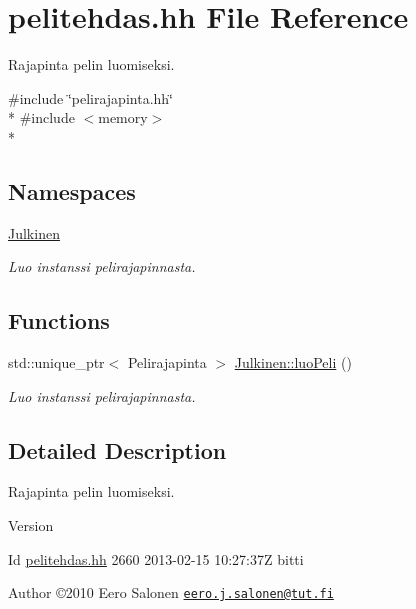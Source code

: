 \hypertarget{pelitehdas_8hh}{}\section{pelitehdas.\+hh File Reference}
\label{pelitehdas_8hh}


Rajapinta pelin luomiseksi.  


{\ttfamily \#include \char`\"{}pelirajapinta.\+hh\char`\"{}}\\*
{\ttfamily \#include $<$memory$>$}\\*
\subsection*{Namespaces}
\begin{DoxyCompactItemize}
\item 
 \hyperlink{namespace_julkinen}{Julkinen}
\begin{DoxyCompactList}\small\item\em Luo instanssi pelirajapinnasta. \end{DoxyCompactList}\end{DoxyCompactItemize}
\subsection*{Functions}
\begin{DoxyCompactItemize}
\item 
std\+::unique\+\_\+ptr$<$ Pelirajapinta $>$ \hyperlink{namespace_julkinen_a6f662833317a55a3a221cb4a3147086e}{Julkinen\+::luo\+Peli} ()
\begin{DoxyCompactList}\small\item\em Luo instanssi pelirajapinnasta. \end{DoxyCompactList}\end{DoxyCompactItemize}


\subsection{Detailed Description}
Rajapinta pelin luomiseksi. 

\begin{DoxyVersion}{Version}

\end{DoxyVersion}
\begin{DoxyParagraph}{Id}
\hyperlink{pelitehdas_8hh}{pelitehdas.\+hh} 2660 2013-\/02-\/15 10\+:27\+:37\+Z bitti 
\end{DoxyParagraph}


\begin{DoxyAuthor}{Author}
©2010 Eero Salonen \href{mailto:eero.j.salonen@tut.fi}{\tt eero.\+j.\+salonen@tut.\+fi} 
\end{DoxyAuthor}
